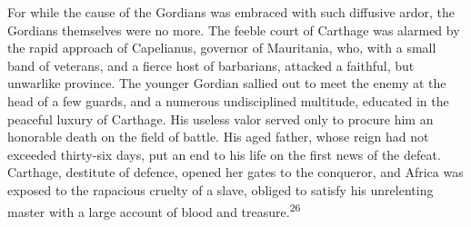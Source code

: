 
For while the cause of the Gordians was embraced with such
diffusive ardor, the Gordians themselves were no more. The feeble
court of Carthage was alarmed by the rapid approach of
Capelianus, governor of Mauritania, who, with a small band of
veterans, and a fierce host of barbarians, attacked a faithful,
but unwarlike province. The younger Gordian sallied out to meet
the enemy at the head of a few guards, and a numerous
undisciplined multitude, educated in the peaceful luxury of
Carthage. His useless valor served only to procure him an
honorable death on the field of battle. His aged father, whose
reign had not exceeded thirty-six days, put an end to his life on
the first news of the defeat. Carthage, destitute of defence,
opened her gates to the conqueror, and Africa was exposed to the
rapacious cruelty of a slave, obliged to satisfy his unrelenting
master with a large account of blood and treasure.\textsuperscript{26}


